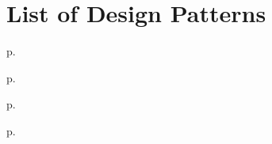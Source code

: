 \chapter{List of Design Patterns}
\label{app:listDesignPatterns}

{
\begin{myItemize}
	\item[] \emph{\patPatternLayering}  						\hfill p.  \pageref{\patPatternLayering}
	\item[] \emph{\patPatternLayeringHybrid} 					\hfill p.  \pageref{\patPatternLayeringHybrid}
	\item[] \patCatAlternatives
	\begin{myItemize}
		\item[] \emph{\patAlternativeBaked}  					\hfill p.  \pageref{\patAlternativeBaked}
		\item[] \emph{\patAlternativeDifferentMatierals }  		\hfill p.  \pageref{\patAlternativeDifferentMatierals}
	\end{myItemize}
\end{myItemize}
}%


